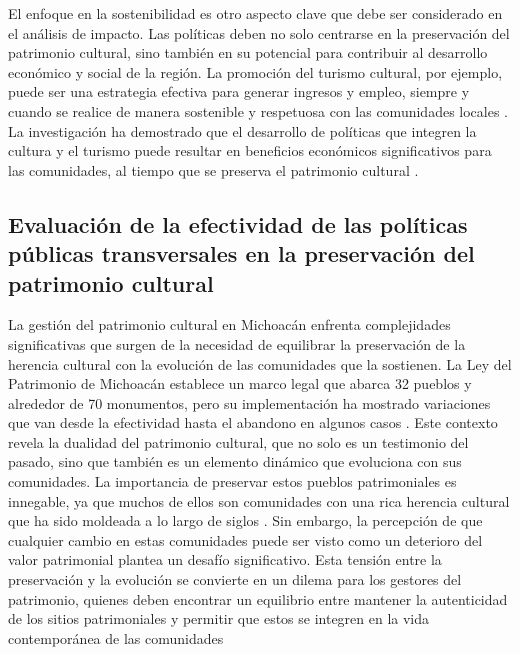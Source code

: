 \documentclass[
  spanish,
  11pt,
  a4paper,
]{scrbook}
\begin{document}
El enfoque en la sostenibilidad es otro aspecto clave que debe ser
considerado en el análisis de impacto. Las políticas deben no solo
centrarse en la preservación del patrimonio cultural, sino también en su
potencial para contribuir al desarrollo económico y social de la región.
La promoción del turismo cultural, por ejemplo, puede ser una estrategia
efectiva para generar ingresos y empleo, siempre y cuando se realice de
manera sostenible y respetuosa con las comunidades locales
\autocite{Gravagnuolo2021}. La investigación ha demostrado que el
desarrollo de políticas que integren la cultura y el turismo puede
resultar en beneficios económicos significativos para las comunidades,
al tiempo que se preserva el patrimonio cultural \autocite{Fatoric2023}.

\subsection*{Evaluación de la efectividad de las políticas públicas
transversales en la preservación del patrimonio
cultural}\label{evaluaciuxf3n-de-la-efectividad-de-las-poluxedticas-puxfablicas-transversales-en-la-preservaciuxf3n-del-patrimonio-cultural}

La gestión del patrimonio cultural en Michoacán enfrenta complejidades
significativas que surgen de la necesidad de equilibrar la preservación
de la herencia cultural con la evolución de las comunidades que la
sostienen. La Ley del Patrimonio de Michoacán establece un marco legal
que abarca 32 pueblos y alrededor de 70 monumentos, pero su
implementación ha mostrado variaciones que van desde la efectividad
hasta el abandono en algunos casos \autocite{Mayordomo2020}. Este
contexto revela la dualidad del patrimonio cultural, que no solo es un
testimonio del pasado, sino que también es un elemento dinámico que
evoluciona con sus comunidades. La importancia de preservar estos
pueblos patrimoniales es innegable, ya que muchos de ellos son
comunidades con una rica herencia cultural que ha sido moldeada a lo
largo de siglos \autocite{Fracasso2019}. Sin embargo, la percepción de
que cualquier cambio en estas comunidades puede ser visto como un
deterioro del valor patrimonial plantea un desafío significativo. Esta
tensión entre la preservación y la evolución se convierte en un dilema
para los gestores del patrimonio, quienes deben encontrar un equilibrio
entre mantener la autenticidad de los sitios patrimoniales y permitir
que estos se integren en la vida contemporánea de las comunidades
\end{document}
